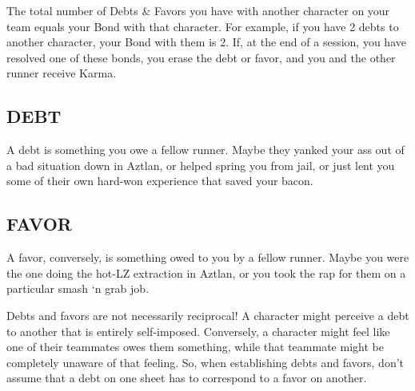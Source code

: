 The total number of Debts \& Favors you have with another character on your team equals your Bond with that character. For example, if you have 2 debts to another character, your Bond with them is 2. If, at the end of a session, you have resolved one of these bonds, you erase the debt or favor, and you and the other runner receive Karma.

\subsection{DEBT}
A debt is something you owe a fellow runner. Maybe they yanked your ass out of a bad situation down in Aztlan, or helped spring you from jail, or just lent you some of their own hard-won experience that saved your bacon.

\subsection{FAVOR}
A favor, conversely, is something owed to you by a fellow runner. Maybe you were the one doing the hot-LZ extraction in Aztlan, or you took the rap for them on a particular smash ‘n grab job.

Debts and favors are not necessarily reciprocal! A character might perceive a debt to another that is entirely self-imposed. Conversely, a character might feel like one of their teammates owes them something, while that teammate might be completely unaware of that feeling. So, when establishing debts and favors, don’t assume that a debt on one sheet has to correspond to a favor on another.
